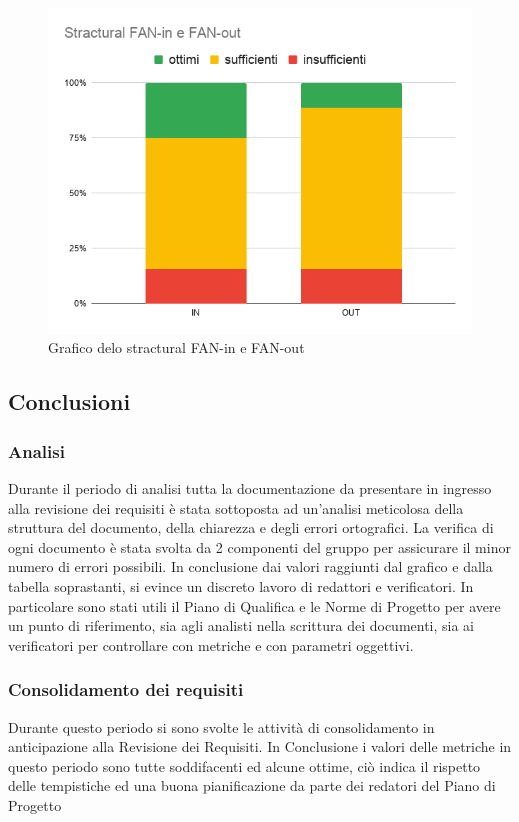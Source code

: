     \begin{figure}[H]
        \centering
        \includegraphics[width=13 cm]{source/sections/images/SfinSfout.png}
        \caption{Grafico delo stractural FAN-in e FAN-out}
    \end{figure}

\newpage
\subsection{Conclusioni}

\subsubsection{Analisi}
Durante il periodo di analisi tutta la documentazione da presentare in ingresso alla revisione dei requisiti è stata sottoposta ad un'analisi meticolosa della struttura del documento, della chiarezza e degli errori ortografici. La verifica di ogni documento è stata svolta da 2 componenti del gruppo per assicurare il minor numero di errori possibili.
\newline
In conclusione dai valori raggiunti dal grafico e dalla tabella soprastanti, si evince un discreto lavoro di redattori e verificatori. In particolare sono stati utili il Piano di Qualifica e le Norme di Progetto per avere un punto di riferimento, sia agli analisti nella scrittura dei documenti, sia ai verificatori per controllare con metriche e con parametri oggettivi.

\subsubsection{Consolidamento dei requisiti}
Durante questo periodo si sono svolte le attività di consolidamento in anticipazione alla Revisione dei Requisiti.
In Conclusione i valori delle metriche in questo periodo sono tutte soddifacenti ed alcune ottime, ciò indica il rispetto delle tempistiche ed una buona pianificazione da parte dei redatori del Piano di Progetto

